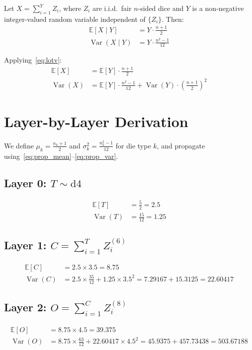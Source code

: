 \documentclass[11pt,a4paper]{article}
\begin{document}
Let $X = \sum_{i=1}^{Y} Z_i$, where $Z_i$ are i.i.d.\ fair $n$-sided dice and $Y$ is a
non-negative integer-valued random variable independent of $\{Z_i\}$. Then:
\begin{align}
    \mathbb{E}[X \mid Y] &= Y \cdot \frac{n+1}{2} \\[4pt]
    \operatorname{Var}(X \mid Y) &= Y \cdot \frac{n^2-1}{12}
\end{align}

Applying~\eqref{eq:lotv}:
\begin{align}
    \mathbb{E}[X] &= \mathbb{E}[Y] \cdot \frac{n+1}{2}
    \label{eq:prop_mean} \\[6pt]
    \operatorname{Var}(X) &= \mathbb{E}[Y] \cdot \frac{n^2-1}{12}
        + \operatorname{Var}(Y) \cdot \left(\frac{n+1}{2}\right)^{\!2}
    \label{eq:prop_var}
\end{align}

\section{Layer-by-Layer Derivation}

We define $\mu_k = \frac{n_k+1}{2}$ and $\sigma_k^2 = \frac{n_k^2-1}{12}$ for
die type $k$, and propagate using~\eqref{eq:prop_mean}--\eqref{eq:prop_var}.

\subsection{Layer 0: $T \sim \mathrm{d}4$}
\begin{align*}
    \mathbb{E}[T] &= \frac{5}{2} = 2.5 \\
    \operatorname{Var}(T) &= \frac{15}{12} = 1.25
\end{align*}

\subsection{Layer 1: $C = \sum_{i=1}^{T} Z_i^{(6)}$}
\begin{align*}
    \mathbb{E}[C] &= 2.5 \times 3.5 = 8.75 \\
    \operatorname{Var}(C) &= 2.5 \times \frac{35}{12} + 1.25 \times 3.5^2
        = 7.29167 + 15.3125 = 22.60417
\end{align*}

\subsection{Layer 2: $O = \sum_{i=1}^{C} Z_i^{(8)}$}
\begin{align*}
    \mathbb{E}[O] &= 8.75 \times 4.5 = 39.375 \\
    \operatorname{Var}(O) &= 8.75 \times \frac{63}{12} + 22.60417 \times 4.5^2
        = 45.9375 + 457.73438 = 503.67188
\end{align*}
\end{document}
